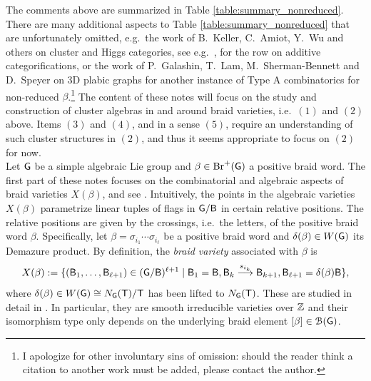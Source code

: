 \noindent The comments above are summarized in Table \ref{table:summary_nonreduced}. There are many additional aspects to Table \ref{table:summary_nonreduced} that are unfortunately omitted, e.g.~the work of B.~Keller, C.~Amiot, Y.~Wu and others on cluster and Higgs categories, see e.g.~\cite{MR2640929,amiot2011generalizedclustercategories,MR2764906,MR3024264,MR4289034,MR4157113,MR2762547,Keller12_DT2,MR2795754,MR2385670,MR2316979,MR4581969,MR4576399}, for the row on additive categorifications, or the work of P.~Galashin, T.~Lam, M.~Sherman-Bennett and D.~Speyer on 3D plabic graphs \cite{GalashinLamShermanBennettSpeyer2022TypeA} for another instance of Type A combinatorics for non-reduced $\beta$.\footnote{I apologize for other involuntary sins of omission: should the reader think a citation to another work must be added, please contact the author.} The content of these notes will focus on the study and construction of cluster algebras in and around braid varieties, i.e.~$(1)$ and $(2)$ above. Items $(3)$ and $(4)$, and in a sense $(5)$, require an understanding of such cluster structures in $(2)$, and thus it seems appropriate to focus on $(2)$ for now.\\

 Let $\mathsf{G}$ be a simple algebraic Lie group and $\beta\in\text{Br}^+(\mathsf{G})$ a positive braid word. The first part of these notes focuses on the combinatorial and algebraic aspects of braid varieties $X(\beta)$, \cite{CGGJ24,CGGLSS25} and see \cite[Appendix B]{trinh2021heckecategoryunipotentlocus}. Intuitively, the points in the algebraic varieties $X(\beta)$ parametrize linear tuples of flags in $\mathsf{G}/\mathsf{B}$ in certain relative positions. The relative positions are given by the crossings, i.e.~the letters, of the positive braid word $\beta$. Specifically, let $\beta = \sigma_{i_1}\cdots \sigma_{i_{\ell}}$ be a positive braid word and $\delta(\beta) \in W(\mathsf{G})$ its Demazure product. By definition, the {\it braid variety} associated with $\beta$ is
\begin{equation}\label{eq:braid_variety}
X(\beta) := \{(\borel_1, \dots, \borel_{\ell+1}) \in (\G/\borel)^{\ell + 1} \mid \borel_1 = \borel, \borel_{k} \buildrel s_{i_{k}} \over \longrightarrow \borel_{k+1}, \borel_{\ell + 1} = \delta(\beta) \borel \},
\end{equation}
\noindent where $\delta(\beta) \in W(\mathsf{G}) \cong N_{\mathsf{G}}(\mathsf{T})/\mathsf{T}$ has been lifted to $N_{\mathsf{G}}(\mathsf{T})$. These are studied in detail in . In particular, they are smooth irreducible varieties over $\mathbb{Z}$ and their isomorphism type only depends on the underlying braid element $[\beta]\in\mathcal{B}(\mathsf{G})$.

